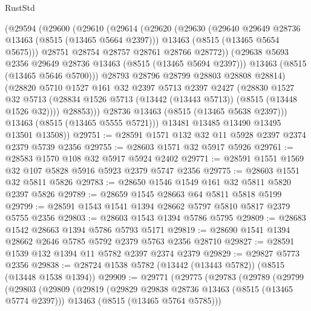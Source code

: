 \begin{lexlean}{RustStd}
\begin{coremodule}
              (@29594
                (@29600
                  (@29610
                    (@29614
                      (@29620
                        (@29630
                          (@29640 @29649 @28736 @13463 (@8515 (@13465 @5664 @2397)))
                          @13463
                          (@8515 (@13465 @5654 @5675)))
                        @28751
                        @28754
                        @28757
                        @28761
                        @28766
                        @28772))
                    (@29638 @5693 @2356 @29649 @28736 @13463 (@8515 (@13465 @5694 @2397)))
                    @13463
                    (@8515 (@13465 @5646 @5700)))
                  @28793
                  @28796
                  @28799
                  @28803
                  @28808
                  @28814)
                (@28820
                  @5710
                  @1527
                  @161
                  @32
                  @2397
                  @5713
                  @2397
                  @2427
                  (@28830
                    @1527
                    @32
                    @5713
                    (@28834 @1526 @5713 (@13442 (@13443 @5713)) (@8515 (@13448 @1526 @32))))
                  @28853)))
            @28736
            @13463
            (@8515 (@13465 @5638 @2397)))
          @13463
          (@8515 (@13465 @5555 @5721)))
        @13481
        @13485
        @13490
        @13495
        @13501
        @13508))
@29751 := @28591 @1571 @132 @32 @11 @5928 @2397 @2374 @2379 @5739 @2356
@29755 := @28603 @1571 @32 @5917 @5926
@29761 := @28583 @1570 @108 @32 @5917 @5924 @2402
@29771 := @28591 @1551 @1569 @32 @107 @5828 @5916 @5923 @2379 @5747 @2356
@29775 := @28603 @1551 @32 @5811 @5826
@29783 := @28650 @1546 @1549 @161 @32 @5811 @5820 @2397 @5826
@29789 := @28659 @1545 @28663 @64 @5811 @5818 @5199
@29799 := @28591 @1543 @1541 @1394 @28662 @5797 @5810 @5817 @2379 @5755 @2356
@29803 := @28603 @1543 @1394 @5786 @5795
@29809 := @28683 @1542 @28663 @1394 @5786 @5793 @5171
@29819 := @28690 @1541 @1394 @28662 @2646 @5785 @5792 @2379 @5763 @2356 @28710
@29827 := @28591 @1539 @132 @1394 @11 @5782 @2397 @2374 @2379
@29829 := @29827 @5773 @2356
@29838 := @28724 @1538 @5782 (@13442 (@13443 @5782)) (@8515 (@13448 @1538 @1394))
@29909 := @29771
    (@29775
      (@29783
        (@29789
          (@29799
            (@29803
              (@29809
                (@29819
                  (@29829 @29838 @28736 @13463 (@8515 (@13465 @5774 @2397)))
                  @13463
                  (@8515 (@13465 @5764 @5785)))

\end{coremodule}
\end{lexlean}
